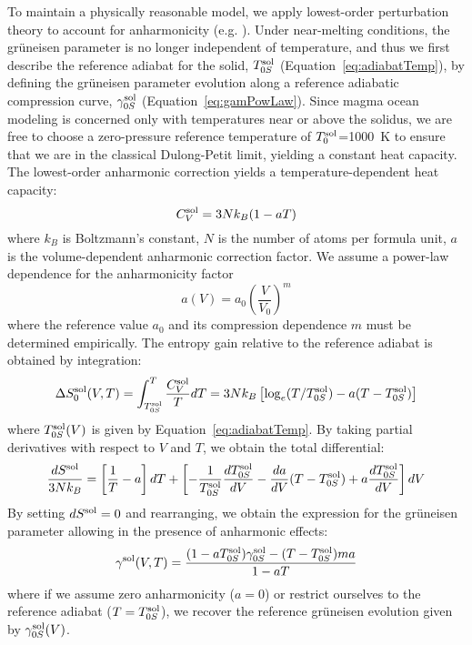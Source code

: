 To maintain a physically reasonable model, we apply lowest-order perturbation theory to account for anharmonicity (e.g. \cite{ZK71,OD03}).
Under near-melting conditions, the gr\"{u}neisen parameter is no longer independent of temperature, and thus we first describe the reference adiabat for the solid, $T_{0S}^{\rm sol}$ (Equation~\ref{eq:adiabatTemp}), by defining the gr\"{u}neisen parameter evolution along a reference adiabatic compression curve, $\gamma_{0S}^{\rm sol}$ (Equation~\ref{eq:gamPowLaw}).
Since magma ocean modeling is concerned only with temperatures near or above the solidus, we are free to choose a zero-pressure reference temperature of $T_0^{\rm sol}$=1000~K to ensure that we are in the classical Dulong-Petit limit, yielding a constant heat capacity.
The lowest-order anharmonic correction yields a temperature-dependent heat capacity:
\begin{equation}
  C_V^{\rm sol} = 3N k_B (1 - aT)
  \label{Cv}
\end{equation}
where $k_B$ is Boltzmann's constant, $N$ is the number of atoms per formula unit, $a$ is the volume-dependent anharmonic correction factor.
We assume a power-law dependence for the anharmonicity factor
\begin{equation}
  a(V) = a_0 \left( \frac{V}{V_0} \right)^m
  \label{anhPowLaw}
\end{equation}
where the reference value $a_0$ and its compression dependence $m$ must be determined empirically.
The entropy gain relative to the reference adiabat is obtained by integration:
\begin{equation}
  \Delta S_0^{\rm sol}(V,T) = \int_{T_{0S}^{\rm sol}}^T  \frac{C_V^{\rm sol}}{T} dT = 3N k_B \left[ \log_e (T/T_{0S}^{\rm sol}) - a(T - T_{0S}^{\rm sol}) \right]
  \label{anhEntropy}
\end{equation}
where $T_{0S}^{\rm sol}(V)$ is given by Equation~\eqref{eq:adiabatTemp}.
By taking partial derivatives with respect to $V$ and $T$, we obtain the total differential:
\begin{equation}
  \frac{dS^{\rm sol}}{3N k_B} = \left[ \frac{1}{T} - a \right] dT + \left[ - \frac{1}{T_{0S}^{\rm sol}}\frac{d T_{0S}^{\rm sol}}{dV} -\frac{da}{dV}(T-T_{0S}^{\rm sol}) + a \frac{dT_{0S}^{\rm sol}}{dV}\right]dV
\end{equation}
By setting $dS^{\rm sol}=0$ and rearranging, we obtain the expression for the gr\"{u}neisen parameter allowing in the presence of anharmonic effects:
\begin{equation}
  \gamma^{\rm sol}(V,T) = \frac{(1-a T_{0S}^{\rm sol})\gamma_{0S}^{\rm sol} - (T-T_{0S}^{\rm sol})ma}{1-aT}
  \label{anhGam}
\end{equation}
where if we assume zero anharmonicity ($a=0$) or restrict ourselves to the reference adiabat ($T=T_{0S}^{\rm sol}$), we recover the reference gr\"{u}neisen evolution given by $\gamma_{0S}^{\rm sol}(V)$.

